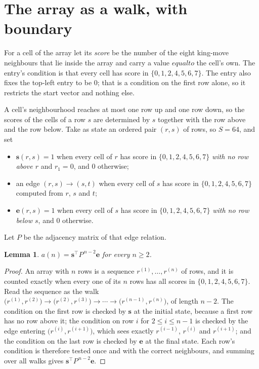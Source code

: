 \documentclass[11pt,a4paper]{article}
\theoremstyle{plain}
\newtheorem{lemma}[theorem]{Lemma}
\theoremstyle{definition}
\begin{document}
\section{The array as a walk, with boundary}

For a cell of the array let its \emph{score} be the number of the eight king-move neighbours that lie inside
the array and carry a value $equal to$ the cell's own. The entry's condition is that every cell
has score in $\{0,1,2,4,5,6,7\}$. The entry also fixes the top-left entry to be $0$; that is a condition on the first row alone, so it restricts the start vector and nothing else.

A cell's neighbourhood reaches at most one row up and one row down, so the scores of the
cells of a row $s$ are determined by $s$ together with the row above and the row below.
Take as state an ordered pair $(r,s)$ of rows, so $S=64$, and set
\begin{itemize}
\item $\mathbf{s}(r,s)=1$ when every cell of $r$ has score in $\{0,1,2,4,5,6,7\}$ \emph{with no row
above $r$} and $r_1=0$, and $0$ otherwise;
\item an edge $(r,s)\to(s,t)$ when every cell of $s$ has score in $\{0,1,2,4,5,6,7\}$ computed from
$r$, $s$ and $t$;
\item $\mathbf{e}(r,s)=1$ when every cell of $s$ has score in $\{0,1,2,4,5,6,7\}$ \emph{with no row
below $s$}, and $0$ otherwise.
\end{itemize}
Let $P$ be the adjacency matrix of that edge relation.

\begin{lemma}\label{lem:walk}
$a(n)=\mathbf{s}^{\!\top}P^{\,n-2}\mathbf{e}$ for every $n\ge2$.
\end{lemma}

\begin{proof}
An array with $n$ rows is a sequence $r^{(1)},\dots,r^{(n)}$ of rows, and it is counted
exactly when every one of its $n$ rows has all scores in $\{0,1,2,4,5,6,7\}$. Read the sequence as the
walk $\bigl(r^{(1)},r^{(2)}\bigr)\to\bigl(r^{(2)},r^{(3)}\bigr)\to\cdots\to
\bigl(r^{(n-1)},r^{(n)}\bigr)$, of length $n-2$. The condition on the first row is
checked by $\mathbf{s}$ at the initial state, because a first row has no row above it; the
condition on row $i$ for $2\le i\le n-1$ is checked by the edge entering
$\bigl(r^{(i)},r^{(i+1)}\bigr)$, which sees exactly $r^{(i-1)}$, $r^{(i)}$ and
$r^{(i+1)}$; and the condition on the last row is checked by $\mathbf{e}$ at the final
state. Each row's condition is therefore tested once and with the correct neighbours, and
summing over all walks gives $\mathbf{s}^{\!\top}P^{\,n-2}\mathbf{e}$.
\end{proof}
\end{document}
